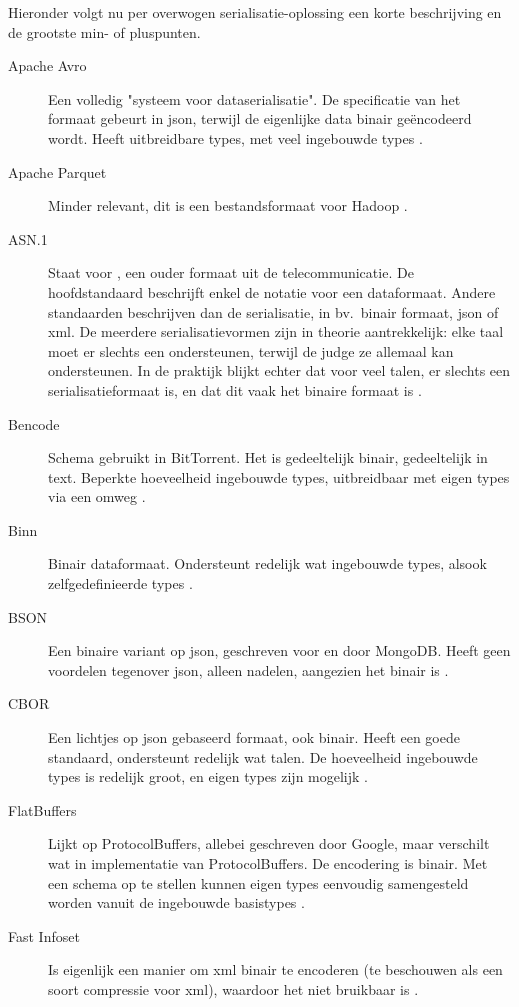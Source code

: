Hieronder volgt nu per overwogen serialisatie-oplossing een korte beschrijving en de grootste min- of pluspunten.

\begin{description}
    \item[Apache Avro] Een volledig "systeem voor dataserialisatie".
    De specificatie van het formaat gebeurt in json, terwijl de eigenlijke data binair geëncodeerd wordt.
    Heeft uitbreidbare types, met veel ingebouwde types \autocite{avro}.
    \item[Apache Parquet] Minder relevant, dit is een bestandsformaat voor Hadoop \autocite{parquet}.
    \item[ASN.1] Staat voor , een ouder formaat uit de telecommunicatie.
    De hoofdstandaard beschrijft enkel de notatie voor een dataformaat.
    Andere standaarden beschrijven dan de serialisatie, in bv.\ binair formaat, json of xml.
    De meerdere serialisatievormen zijn in theorie aantrekkelijk: elke taal moet er slechts een ondersteunen, terwijl de judge ze allemaal kan ondersteunen.
    In de praktijk blijkt echter dat voor veel talen, er slechts een serialisatieformaat is, en dat dit vaak het binaire formaat is \autocite{x680}.
    \item[Bencode] Schema gebruikt in BitTorrent.
    Het is gedeeltelijk binair, gedeeltelijk in text.
    Beperkte hoeveelheid ingebouwde types, uitbreidbaar met eigen types via een omweg \autocite{cohen2017}.
    \item[Binn] Binair dataformaat.
    Ondersteunt redelijk wat ingebouwde types, alsook zelfgedefinieerde types \autocite{ramos2019}.
    \item[BSON] Een binaire variant op json, geschreven voor en door MongoDB\@.
    Heeft geen voordelen tegenover json, alleen nadelen, aangezien het binair is \autocite{bson}.
    \item[CBOR] Een lichtjes op json gebaseerd formaat, ook binair.
    Heeft een goede standaard, ondersteunt redelijk wat talen.
    De hoeveelheid ingebouwde types is redelijk groot, en eigen types zijn mogelijk \autocite{rfc7049}.
    \item[FlatBuffers] Lijkt op ProtocolBuffers, allebei geschreven door Google, maar verschilt wat in implementatie van ProtocolBuffers.
    De encodering is binair.
    Met een schema op te stellen kunnen eigen types eenvoudig samengesteld worden vanuit de ingebouwde basistypes \autocite{flatbuffers}.
    \item[Fast Infoset] Is eigenlijk een manier om xml binair te encoderen (te beschouwen als een soort compressie voor xml), waardoor het niet bruikbaar is \autocite{x981}.

\end{description}
